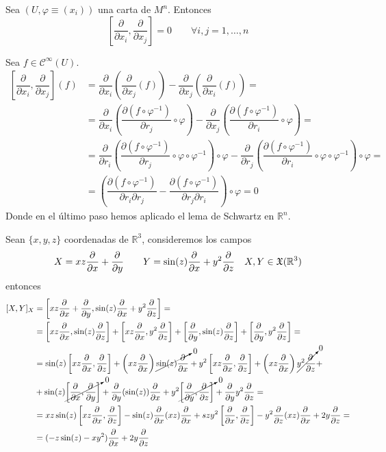 \begin{prop}
Sea $(U,\varphi\equiv (x_i))$ una carta de $M^n$. Entonces $$\left[\dfrac{\partial}{\partial x_i}, \dfrac{\partial}{\partial x_j}\right] = 0 \qquad \forall i,j = 1,\dots,n$$
\end{prop}
\begin{dem}
Sea $f \in \mathcal{C}^{\infty}(U)$. 
\[ \begin{split}
\left[\dfrac{\partial}{\partial x_i}, \dfrac{\partial}{\partial x_j}\right](f)&  =  \dfrac{\partial}{\partial x_i}\left(\dfrac{\partial}{\partial x_j}(f)\right) - \dfrac{\partial}{\partial x_j}\left(\dfrac{\partial}{\partial x_i}(f)\right) = \\ & = \dfrac{\partial}{\partial x_i}\left(\dfrac{\partial (f\circ \varphi^{-1})}{\partial r_j} \circ \varphi \right) - \dfrac{\partial}{\partial x_j}\left(\dfrac{\partial (f\circ \varphi^{-1})}{\partial r_i} \circ \varphi \right)  = \\ & = \dfrac{\partial}{\partial r_i} \left(\dfrac{\partial (f\circ \varphi^{-1})}{\partial r_j} \circ \varphi \circ \varphi^{-1} \right) \circ \varphi - \dfrac{\partial}{\partial r_j} \left(\dfrac{\partial (f\circ \varphi^{-1})}{\partial r_i} \circ \varphi \circ \varphi^{-1} \right) \circ \varphi= \\ & = \left(\dfrac{\partial (f\circ \varphi^{-1})}{\partial r_i \partial r_j} - \dfrac{\partial (f\circ \varphi^{-1})}{\partial r_j \partial r_i} \right) \circ \varphi = 0 \end{split}\]
Donde en el último paso hemos aplicado el lema de Schwartz en $\mathbb{R}^n$.
\end{dem}
\begin{ejem}
    Sean $\{x,y,z\}$ coordenadas de $\mathbb R^3$, consideremos los campos 
    $$X=xz\dfrac{\partial^{} }{\partial x}+\dfrac{\partial^{} }{\partial y}\qquad Y=\sin(z)\dfrac{\partial^{} }{\partial x} + y^2 \dfrac{\partial^{} }{\partial z} \quad X,Y \in \mathfrak X(\mathbb R^3)$$
    entonces
    \[ \begin{split}
        [X,Y]_X & = \left[xz\dfrac{\partial^{} }{\partial x}+\dfrac{\partial^{} }{\partial y}, \sin(z)\dfrac{\partial^{} }{\partial x} + y^2 \dfrac{\partial^{} }{\partial z} \right] = \\ & = \left[ xz\dfrac{\partial^{} }{\partial x}, \sin(z)\dfrac{\partial^{} }{\partial z}\right] + \left[ xz\dfrac{\partial^{} }{\partial x}, y^2 \dfrac{\partial^{} }{\partial z}\right]+\left[ \dfrac{\partial^{} }{\partial y}, \sin(z) \dfrac{\partial^{} }{\partial z} \right]+\left[ \dfrac{\partial^{} }{\partial y},y^2 \dfrac{\partial^{} }{\partial z} \right] = \\ & = \sin(z)\left[ xz\dfrac{\partial^{} }{\partial x}, \dfrac{\partial^{} }{\partial z}\right] + \left( xz \dfrac{\partial^{} }{\partial x}\right) \cancelto{0}{\sin(z) \dfrac{\partial^{} }{\partial x}} + y^2 \left[ xz\dfrac{\partial^{} }{\partial x}, \dfrac{\partial^{} }{\partial z} \right] +  \left( xz \dfrac{\partial^{} }{\partial x}\right) \cancelto{0}{y^2 \dfrac{\partial^{} }{\partial z}} + \\ & +
        \sin(z) \cancelto{0}{\left[ \dfrac{\partial^{} }{\partial x},\dfrac{\partial^{} }{\partial y}\right]} + \dfrac{\partial^{} }{\partial y} (\sin(z)) \dfrac{\partial^{} }{\partial x} + y^2 \cancelto{0}{\left[ \dfrac{\partial^{} }{\partial y},\dfrac{\partial^{} }{\partial z}\right]} + \dfrac{\partial^{} }{\partial y} y^2 \dfrac{\partial^{} }{\partial z} = \\ & = xz\sin(z)\left[ xz\dfrac{\partial^{} }{\partial x}, \dfrac{\partial^{} }{\partial z}\right] -\sin(z)\dfrac{\partial^{} }{\partial x} (xz) \dfrac{\partial^{} }{\partial x} + szy^2 \left[ \dfrac{\partial^{} }{\partial x}, \dfrac{\partial^{} }{\partial z}\right] - y^2 \dfrac{\partial^{} }{\partial z} (xz) \dfrac{\partial^{} }{\partial x} + 2y \dfrac{\partial^{} }{\partial z} = \\ & = (-z\sin(z)-xy^2)\dfrac{\partial^{} }{\partial x} + 2y \dfrac{\partial^{} }{\partial z}
    \end{split}\]
\end{ejem}

